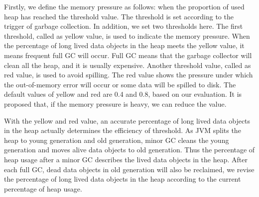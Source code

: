 

Firstly, we define the memory pressure as follows: when the proportion of used heap has reached the threshold value. The threshold is set according to the trigger of garbage collection. In addition, we set two thresholds here. The first threshold, called as yellow value, is used to indicate the memory pressure. When the percentage of long lived data objects in the heap meets the yellow value, it means frequent full GC will occur. Full GC means that the garbage collector will clean all the heap, and it is usually expensive. Another threshold value, called as red value, is used to avoid spilling. The red value shows the pressure under which the out-of-memory error will occur or some data will be spilled to disk. The default values of yellow and red are 0.4 and 0.8, based on our evaluation. It is proposed that, if the memory pressure is heavy, we can reduce the value.

With the yellow and red value, an accurate percentage of long lived data objects in the heap actually determines the efficiency of threshold. As JVM splits the heap to young generation and old generation, minor GC cleans the young generation and moves alive data objects to old generation. Thus the percentage of heap usage after a minor GC describes the lived data objects in the heap. After each full GC, dead data objects in old generation will also be reclaimed, we revise the percentage of long lived data objects in the heap according to the current percentage of heap usage.



